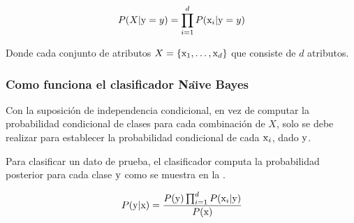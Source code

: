 \begin{equation} \label{eq:bayes-conditional-independence}
  P(X|{\textnormal{y}}=y) = \prod_{i=1}^{d} P({\textnormal{x}}_i|{\textnormal{y}}=y)
\end{equation}

Donde cada conjunto de atributos $X=\{ {\textnormal{x}}_1, \ldots, {\textnormal{x}}_d \}$ que consiste de $d$ atributos.
\subsubsection{Como funciona el clasificador Na\"{\i}ve Bayes}
Con la suposición de independencia condicional, en vez de computar la probabilidad condicional de clases para cada combinación de $X$, solo se debe realizar para establecer la probabilidad condicional de cada ${\textnormal{x}}_i$, dado ${\textnormal{y}}$.

Para clasificar un dato de prueba, el clasificador computa la probabilidad posterior para cada clase ${\textnormal{y}}$ como se muestra en la .

\begin{equation} \label{eq:bayes-classifier}
  P({\textnormal{y}}|{\textnormal{x}}) = \frac{P({\textnormal{y}}) \prod_{i=1}^{d}P({\textnormal{x}}_i|{\textnormal{y}})}{P({\textnormal{x}})}
\end{equation}

